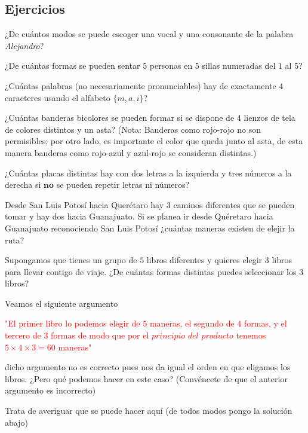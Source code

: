 \documentclass[11pt]{scrartcl}
\begin{document}
\subsection{Ejercicios}

\begin{exercise}
    ¿De cuántos modos se puede escoger una vocal y una consonante de la palabra \textit{Alejandro}?
\end{exercise}
\begin{exercise}
    ¿De cuántas formas se pueden sentar $5$ personas
en $5$ sillas numeradas del $1$ al $5$?
\end{exercise}
\begin{exercise}
    ¿Cuántas palabras (no necesariamente pronunciables)
hay de exactamente $4$ caracteres usando el alfabeto $\{m, a, i\}$?
\end{exercise}
\begin{exercise}
    ¿Cuántas banderas bicolores se pueden formar si
se dispone de 4 lienzos de tela de colores distintos y un asta? (Nota:
Banderas como rojo-rojo no son permisibles; por otro lado, es importante el color que queda junto al asta, de esta manera banderas como
rojo-azul y azul-rojo se consideran distintas.)
\end{exercise}
\begin{exercise}
    ¿Cuántas placas distintas hay con dos letras a
    la izquierda y tres números a la derecha si $\textbf{no}$ se pueden repetir letras ni números?
\end{exercise}
\begin{exercise}
    Desde San Luis Potosí hacia Querétaro hay $3$ caminos
diferentes que se pueden tomar y hay dos hacia Guanajuato. Si se
planea ir desde Quéretaro hacia Guanajuato reconociendo San Luis
Potosí ¿cuántas maneras existen de elejir la ruta?
\end{exercise}

\begin{example}
    Supongamos que tienes un grupo de $5$ libros diferentes y quieres elegir $3$ libros para llevar contigo de viaje. ¿De cuántas formas distintas puedes seleccionar los $3$ libros?
\end{example}

Veamos el siguiente argumento
\begin{center}
    \textcolor{red}{"El primer libro lo podemos elegir de $5$ maneras, el segundo de $4$ formas, y el tercero de $3$ formas de modo que por el $\textit{principio del producto}$ tenemos $5\times4\times3=60$ maneras"}
\end{center}
\begin{flushleft}
    

dicho argumento no es correcto pues nos da igual el orden en que eligamos los libros. ¿Pero qué podemos hacer en este caso? (Convéncete de que el anterior argumento es incorrecto)
\end{flushleft}
\begin{exercise}
    Trata de averiguar que se puede hacer aquí (de todos modos pongo la solución abajo)
\end{exercise}
\end{document}
